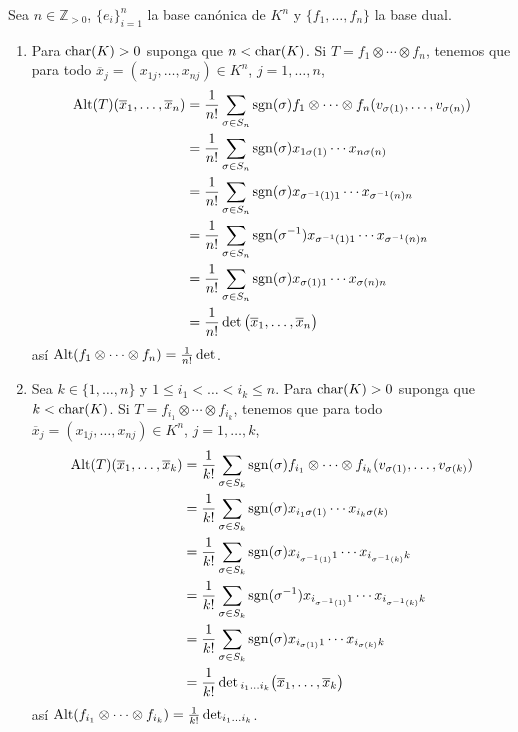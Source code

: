 \begin{ejem} Sea $n\in\mathbb{Z}_{>0}$, $\{e_i\}_{i=1}^n$ la base can\'onica de $K^n$ y $\{f_1,\ldots,f_n\}$ la base dual.
\begin{enumerate}
\item Para $\operatorname{char}(K)>0$ suponga que $n<\operatorname{char}(K)$. Si $T=f_1\otimes\cdots\otimes f_n$, tenemos que para todo $\overline{x}_j=(x_{1j},\ldots,x_{nj})\in K^n$, $j=1,\ldots,n$,
\begin{align*}
\operatorname{Alt}(T)(\overline{x}_1,\ldots,\overline{x}_n) &= \dfrac{1}{n!}\sum_{\sigma\in S_n}\operatorname{sgn}(\sigma)f_1\otimes\cdots\otimes f_n(v_{\sigma(1)},\ldots,v_{\sigma(n)})\\
&= \dfrac{1}{n!}\sum_{\sigma\in S_n}\operatorname{sgn}(\sigma)x_{1\sigma(1)}\cdots x_{n\sigma(n)}\\
&= \dfrac{1}{n!}\sum_{\sigma\in S_n}\operatorname{sgn}(\sigma)x_{\sigma^{-1}(1)1}\cdots x_{\sigma^{-1}(n)n}\\
&= \dfrac{1}{n!}\sum_{\sigma\in S_n}\operatorname{sgn}(\sigma^{-1})x_{\sigma^{-1}(1)1}\cdots x_{\sigma^{-1}(n)n}\\
&= \dfrac{1}{n!}\sum_{\sigma\in S_n}\operatorname{sgn}(\sigma)x_{\sigma(1)1}\cdots x_{\sigma(n)n}\\
&=\dfrac{1}{n!}\det\big(\overline{x}_1,\ldots,\overline{x}_n\big)
\end{align*}
as\'i $\operatorname{Alt}(f_1\otimes\cdots\otimes f_n)=\frac{1}{n!}\det$.
\item Sea $k\in\{1,\ldots,n\}$ y $1\le i_1<\ldots<i_k\le n$. Para $\operatorname{char}(K)>0$ suponga que $k<\operatorname{char}(K)$. Si $T=f_{i_1}\otimes\cdots\otimes f_{i_k}$, tenemos que para todo $\overline{x}_j=(x_{1j},\ldots,x_{nj})\in K^n$, $j=1,\ldots,k$,
\begin{align*}
\operatorname{Alt}(T)(\overline{x}_1,\ldots,\overline{x}_k) &= \dfrac{1}{k!}\sum_{\sigma\in S_k}\operatorname{sgn}(\sigma)f_{i_1}\otimes\cdots\otimes f_{i_k}(v_{\sigma(1)},\ldots,v_{\sigma(k)})\\
&= \dfrac{1}{k!}\sum_{\sigma\in S_k}\operatorname{sgn}(\sigma)x_{i_1\sigma(1)}\cdots x_{i_k\sigma(k)}\\
&= \dfrac{1}{k!}\sum_{\sigma\in S_k}\operatorname{sgn}(\sigma)x_{i_{\sigma^{-1}(1)}1}\cdots x_{i_{\sigma^{-1}(k)}k}\\
&= \dfrac{1}{k!}\sum_{\sigma\in S_k}\operatorname{sgn}(\sigma^{-1})x_{i_{\sigma^{-1}(1)}1}\cdots x_{i_{\sigma^{-1}(k)}k}\\
&= \dfrac{1}{k!}\sum_{\sigma\in S_k}\operatorname{sgn}(\sigma)x_{i_{\sigma(1)}1}\cdots x_{i_{\sigma(k)}k}\\
&=\dfrac{1}{k!}\det{}_{i_1\ldots i_k}\big(\overline{x}_1,\ldots,\overline{x}_k\big)
\end{align*}
as\'i $\operatorname{Alt}(f_{i_1}\otimes\cdots\otimes f_{i_k})=\frac{1}{k!}\det_{i_1\ldots i_k}$.
\end{enumerate}
\end{ejem}

